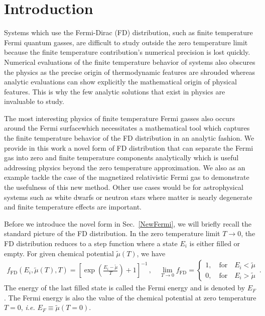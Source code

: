 \documentclass[sn-mathphys,Numbered]{sn-jnl}
\newcommand{\rsec}[1]{Sec.~{\ref{#1}}}
\newcommand*{\ar}{{\color{red}\text{ (Citation!) }}}
\begin{document}
\section{Introduction}
\label{sec1}
Systems which use the Fermi-Dirac (FD) distribution, such as finite temperature Fermi quantum gasses, are difficult to study outside the zero temperature limit because the finite temperature contribution's numerical precision is lost quickly\ar. Numerical evaluations of the finite temperature behavior of systems also obscures the physics as the precise origin of thermodynamic features are shrouded whereas analytic evaluations can show explicitly the mathematical origin of physical features. This is why the few analytic solutions that exist in physics are invaluable to study.

The most interesting physics of finite temperature Fermi gasses also occurs around the Fermi surface\ar which necessitates a mathematical tool which captures the finite temperature behavior of the FD distribution in an analytic fashion. We provide in this work a novel form of FD distribution that can separate the Fermi gas into zero and finite temperature components analytically which is useful addressing physics beyond the zero temperature approximation. We also as an example tackle the case of the magnetized relativistic Fermi gas to demonstrate the usefulness of this new method. Other use cases would be for astrophysical systems such as white dwarfs or neutron stars where matter is nearly degenerate and finite temperature effects are important.

Before we introduce the novel form in \rsec{NewFermi}, we will briefly recall the standard picture of the FD distribution. In the zero temperature limit $T\to0$, the FD distribution reduces to a step function where a state $E_{i}$ is either filled or empty. For given chemical potential $\widetilde\mu(T)$, we have
\begin{align}
\label{f_old}
f_\mathrm{FD}(E_{i},\widetilde\mu(T),T)=\left[\exp\left(\frac{E_{i}-\widetilde\mu}{T}\right)+1\right]^{-1}\,,\quad
\lim_{T\to0}f_\mathrm{FD}=\left\{
\begin{array}{c}
1,\quad\mathrm{for}\quad{E_{i}}<\widetilde\mu\\
0,\quad\mathrm{for}\quad{E_{i}}>\widetilde\mu
\end{array}
\right.\,.
\end{align}
The energy of the last filled state is called the Fermi energy and is denoted by $E_F$. The Fermi energy is also the value of the chemical potential at zero temperature $T=0$, \emph{i.e.} $E_F\equiv\widetilde\mu(T = 0)$.
\end{document}
